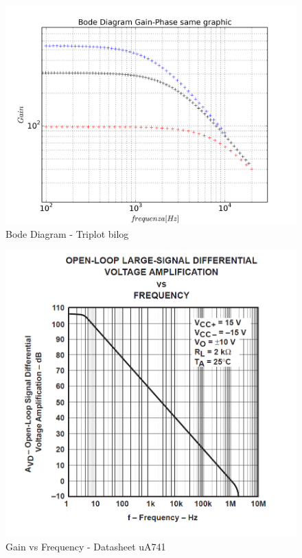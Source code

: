 \documentclass{beamer}
\begin{document}
\begin{frame}
\begin{figure}
\centering
\includegraphics[width=0.9\linewidth]{./es_9_bode_triplot_same_bilog}
\caption{Bode Diagram - Triplot bilog}
\label{fig:es_9_bode_triplot_same_bilog}
\end{figure}

\end{frame}

\begin{frame}
\begin{figure}
\centering
\includegraphics[width=0.7\linewidth]{./ua741}
\caption{Gain vs Frequency - Datasheet uA741}
\label{fig:ua741}
\end{figure}

\end{frame}
\end{document}

